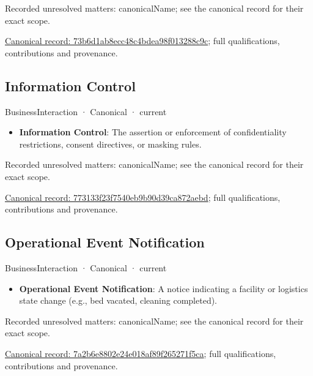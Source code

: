 {\small Recorded unresolved matters: canonicalName; see the canonical record for their exact scope.}\par
{\footnotesize \href{../../../../continuum/business/business-interaction/73b6d1ab8ecc48c4bdea98f013288c9c.md}{Canonical record: 73b6d1ab8ecc48c4bdea98f013288c9c}; full qualifications, contributions and provenance.}\par
\subsection{Information Control}

\label{element:773133f23f7540eb9b90d39ca872aebd}
{\small BusinessInteraction · Canonical · current}\par

\begin{itemize}


\item \textbf{Information Control}: The assertion or enforcement of confidentiality restrictions, consent directives, or masking rules.

\end{itemize}

{\small Recorded unresolved matters: canonicalName; see the canonical record for their exact scope.}\par
{\footnotesize \href{../../../../continuum/business/business-interaction/773133f23f7540eb9b90d39ca872aebd.md}{Canonical record: 773133f23f7540eb9b90d39ca872aebd}; full qualifications, contributions and provenance.}\par
\subsection{Operational Event Notification}

\label{element:7a2b6e8802e24e018af89f265271f5ca}
{\small BusinessInteraction · Canonical · current}\par

\begin{itemize}


\item \textbf{Operational Event Notification}: A notice indicating a facility or logistics state change (e.g., bed vacated, cleaning completed).

\end{itemize}

{\small Recorded unresolved matters: canonicalName; see the canonical record for their exact scope.}\par
{\footnotesize \href{../../../../continuum/business/business-interaction/7a2b6e8802e24e018af89f265271f5ca.md}{Canonical record: 7a2b6e8802e24e018af89f265271f5ca}; full qualifications, contributions and provenance.}\par
